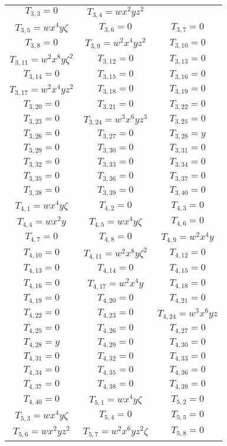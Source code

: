 \documentclass[12pt]{memoireuqam1.3}
\begin{document}
\begin{longtable}{|c|c|c|}
$T_{3,3}= 0$&
$T_{3,4}= wx^2yz^2$\\
$T_{3,5}= wx^4y\zeta$&
$T_{3,6}= 0$&
$T_{3,7}= 0$\\
$T_{3,8}= 0$&
$T_{3,9}= w^2x^4yz^2$&
$T_{3,10}= 0$\\
$T_{3,11}= w^2x^8y\zeta^2$&
$T_{3,12}= 0$&
$T_{3,13}= 0$\\
$T_{3,14}= 0$&
$T_{3,15}= 0$&
$T_{3,16}= 0$\\
$T_{3,17}= w^2x^4yz^2$&
$T_{3,18}= 0$&
$T_{3,19}= 0$\\
$T_{3,20}= 0$&
$T_{3,21}= 0$&
$T_{3,22}= 0$\\
$T_{3,23}= 0$&
$T_{3,24}= w^3x^6yz^3$&
$T_{3,25}= 0$\\
$T_{3,26}= 0$&
$T_{3,27}= 0$&
$T_{3,28}= y$\\
$T_{3,29}= 0$&
$T_{3,30}= 0$&
$T_{3,31}= 0$\\
$T_{3,32}= 0$&
$T_{3,33}= 0$&
$T_{3,34}= 0$\\
$T_{3,35}= 0$&
$T_{3,36}= 0$&
$T_{3,37}= 0$\\
$T_{3,38}= 0$&
$T_{3,39}= 0$&
$T_{3,40}= 0$\\
$T_{4,1}= wx^4y\zeta$&
$T_{4,2}= 0$&
$T_{4,3}= 0$\\
$T_{4,4}= wx^2y$&
$T_{4,5}= wx^4y\zeta$&
$T_{4,6}= 0$\\
$T_{4,7}= 0$&
$T_{4,8}= 0$&
$T_{4,9}= w^2x^4y$\\
$T_{4,10}= 0$&
$T_{4,11}= w^2x^8y\zeta^2$&
$T_{4,12}= 0$\\
$T_{4,13}= 0$&
$T_{4,14}= 0$&
$T_{4,15}= 0$\\
$T_{4,16}= 0$&
$T_{4,17}= w^2x^4y$&
$T_{4,18}= 0$\\
$T_{4,19}= 0$&
$T_{4,20}= 0$&
$T_{4,21}= 0$\\
$T_{4,22}= 0$&
$T_{4,23}= 0$&
$T_{4,24}= w^3x^6yz$\\
$T_{4,25}= 0$&
$T_{4,26}= 0$&
$T_{4,27}= 0$\\
$T_{4,28}= y$&
$T_{4,29}= 0$&
$T_{4,30}= 0$\\
$T_{4,31}= 0$&
$T_{4,32}= 0$&
$T_{4,33}= 0$\\
$T_{4,34}= 0$&
$T_{4,35}= 0$&
$T_{4,36}= 0$\\
$T_{4,37}= 0$&
$T_{4,38}= 0$&
$T_{4,39}= 0$\\
$T_{4,40}= 0$&
$T_{5,1}= wx^4y\zeta$&
$T_{5,2}= 0$\\
$T_{5,3}= wx^4y\zeta$&
$T_{5,4}= 0$&
$T_{5,5}= 0$\\
$T_{5,6}= wx^2yz^2$&
$T_{5,7}= w^2x^6yz^2\zeta$&
$T_{5,8}= 0$\\

\end{longtable}
\end{document}
